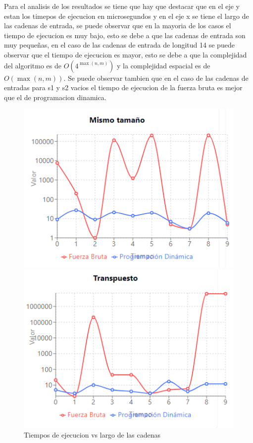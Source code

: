 Para el analisis de los resultados se tiene que hay que destacar que en el eje y estan los timepos de ejecucion en microsegundos
y en el eje x se tiene el largo de las cadenas de entrada, se puede observar que en la mayoria de los casos el tiempo de ejecucion
es muy bajo, esto se debe a que las cadenas de entrada son muy pequeñas, en el caso de las cadenas de entrada de longitud 14 se puede
observar que el tiempo de ejecucion es mayor, esto se debe a que la complejidad del algoritmo es de $O(4^{\max(n,m)})$ y la complejidad
espacial es de $O(\max(n,m))$.
Se puede observar tambien que en el caso de las cadenas de entradas para s1 y s2 vacios el tiempo de ejecucion de la fuerza bruta es mejor
que el de programacion dinamica.


\begin{figure}[H]
    \centering
    \begin{minipage}[t]{0.5\textwidth}
        \includegraphics[width=\textwidth]{images/mismotamanio.png}
    \end{minipage}%
    \begin{minipage}[t]{0.5\textwidth}
        \includegraphics[width=\textwidth]{images/transpuesto.png}   \end{minipage}%
    \caption{Tiempos de ejecucion vs largo de las cadenas}
    \label{fig:Tiempos de ejecucion vs largo de las cadenas}
\end{figure}

